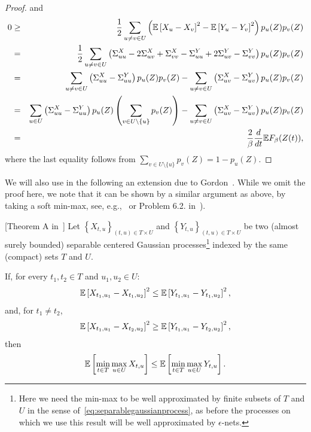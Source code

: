 \begin{proof}
and
\begin{eqnarray*}
0 & \geq & \frac12 \sum_{u\neq v\in U} \left( \mathbb{E}\left[X_{u}-X_{v}\right]^2 - \mathbb{E}\left[Y_{u}-Y_{v}\right]^2 \right) p_u(Z)p_v(Z) \\
 & = & \frac12 \sum_{u\neq v\in U} \left( \Sigma^X_{uu} - 2\Sigma^X_{uv} + \Sigma^X_{vv} - \Sigma^Y_{uu} + 2\Sigma^Y_{uv} -\Sigma^Y_{vv} \right) p_u(Z)p_v(Z)  \\
 & = &  \sum_{u\neq v\in U} \left( \Sigma^X_{uu} -  \Sigma^Y_{uu}\right) p_u(Z)p_v(Z) -   \sum_{u\neq v\in U} \left( \Sigma^X_{uv} -  \Sigma^Y_{uv}\right) p_u(Z)p_v(Z) \\ 
 & = &  \sum_{u\in U} \left( \Sigma^X_{uu} -  \Sigma^Y_{uu}\right) p_u(Z)\left(\sum_{v\in U\setminus \{u\}}p_v(Z)\right) -   \sum_{u\neq v\in U} \left( \Sigma^X_{uv} -  \Sigma^Y_{uv}\right) p_u(Z)p_v(Z) \\
 & = & \frac2{\beta}\frac{d}{dt}\mathbb{E} F_\beta(Z(t)),
\end{eqnarray*}
where the last equality follows from $\sum_{v\in U\setminus \{u\}}p_v(Z) = 1-p_u(Z)$.
\end{proof}

We will also use in the following an extension due to Gordon~\cite{Gordon_comparison_85,Gordon_EscapeMesh}. While we omit the proof here, we note that it can be shown by a similar argument as above, by taking a soft min-max, see, e.g.,~\cite{Gordon_EscapeMesh} or Problem 6.2. in~\cite{vanHandel_LectureNotesProb_14}).

\begin{theorem}\label{Thm:SlepiansIneq_extension_Gordon}[Theorem A in~\cite{Gordon_EscapeMesh}]
Let $\left\{X_{t,u}\right\}_{(t,u)\in T\times U}$ and $\left\{Y_{t,u}\right\}_{(t,u)\in T\times U}$ be two (almost surely bounded) separable centered Gaussian processes\footnote{Here we need the min-max to be well approximated by finite subsets of $T$ and $U$ in the sense of~\eqref{eq:separablegaussianprocess}, as before the processes on which we use this result will be well approximated by $\epsilon$-nets.} indexed by the same (compact) sets $T$ and $U$.

If, for every $t_1,t_2\in T$ and $u_1,u_2 \in U$:
\begin{equation}
\mathbb{E}\left[X_{t_1,u_1}-X_{t_1,u_2}\right]^2 \leq  \mathbb{E}\left[Y_{t_1,u_1}-Y_{t_1,u_2}\right]^2,
\end{equation}
and, for $t_1\neq t_2$,
\begin{equation}
\mathbb{E}\left[X_{t_1,u_1}-X_{t_2,u_2}\right]^2 \geq  \mathbb{E}\left[Y_{t_1,u_1}-Y_{t_2,u_2}\right]^2,
\end{equation}
then
\[
 \mathbb{E}\left[\min_{t\in T}\max_{u\in U}X_{t,u}\right] \leq \mathbb{E}\left[\min_{t\in T}\max_{u\in U}Y_{t,u}\right].
\]
\end{theorem}

